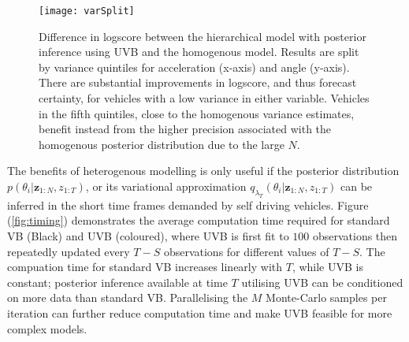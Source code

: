 \documentclass[12pt,a4paper]{article}\usepackage[]{graphicx}\usepackage[]{color}
\begin{document}
\begin{figure}[ht]
\centering
\texttt{[image: varSplit]}
\caption{Difference in logscore between the hierarchical model with posterior inference using UVB and the homogenous model. Results are split by variance quintiles for acceleration (x-axis) and angle (y-axis). There are substantial improvements in logscore, and thus forecast certainty, for vehicles with a low variance in either variable. Vehicles in the fifth quintiles, close to the homogenous variance estimates, benefit instead from the higher precision associated with the homogenous posterior distribution due to the large $N$.}
\label{fig:varSplit}
\end{figure}

The benefits of heterogenous modelling is only useful if the posterior distribution $p(\theta_{i} | \textbf{z}_{1:N}, z_{1:T})$, or its variational approximation $q_{\lambda_T}(\theta_{i} | \textbf{z}_{1:N}, z_{1:T})$ can be inferred in the short time frames demanded by self driving vehicles. Figure (\ref{fig:timing}) demonstrates the average computation time required for standard VB (Black) and UVB (coloured), where UVB is first fit to $100$ observations then repeatedly updated every $T-S$ observations for different values of $T-S$. The compuation time for standard VB increases linearly with $T$, while UVB is constant; posterior inference available at time $T$ utilising UVB can be conditioned on more data than standard VB. 
Parallelising the $M$ Monte-Carlo samples per iteration can further reduce computation time and make UVB feasible for more complex models. 
\\
\end{document}
